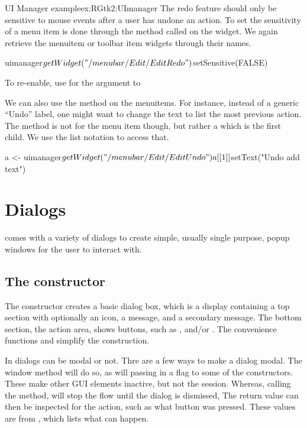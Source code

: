 \begin{example}{UI Manager example}{ex:RGtk2:UImanager}
The redo feature should only be sensitive to mouse events after a user
has undone an action. To set the sensitivity
of a menu item is done through the  method called
on the widget. We again retrieve the menuitem or toolbar item widgets
through their names.

\begin{Schunk}
\begin{Sinput}
 uimanager$getWidget("/menubar/Edit/EditRedo")$setSensitive(FALSE)
\end{Sinput}
\end{Schunk}
To re-enable, use  for the argument to 

We can also use the  method on the menuitems. For
instance, instead of a generic ``Undo'' label, one might want to
change the text to list the most previous action.  The method is not
for the menu item though, but rather a  which is the
first child. We use the list notation to access that.
\begin{Schunk}
\begin{Sinput}
 a <- uimanager$getWidget("/menubar/Edit/EditUndo")
 a[[1]]$setText("Undo add text")
\end{Sinput}
\end{Schunk}
\end{example}


\label{sec:RGtk2:dialogs}
\section{Dialogs}
\label{sec:dialogs}
\GTK\/ comes with a variety of dialogs to create simple, usually
single purpose, popup windows
for the user to interact with.

\subsection{The  constructor}

The constructor  creates a basic dialog box,
which is a display containing a top section with optionally an icon, a
message, and a secondary message. The bottom section, the action area,
shows buttons, such as ,  and/or
. The convenience functions
 and
 simplify the construction.

In \GTK\/ dialogs can be modal or not. Thre are a few ways to make a
dialog modal. The window method  will do
so, as will passing in a  flag to some of the
constructors. These make other GUI elements inactive, but not the \R\/
session. Whereas, calling the  method,
will stop the flow until the dialog is dismissed, The return value can
then be inspected for the action, such as what button was
pressed. These values are from , which lists
what can happen.


